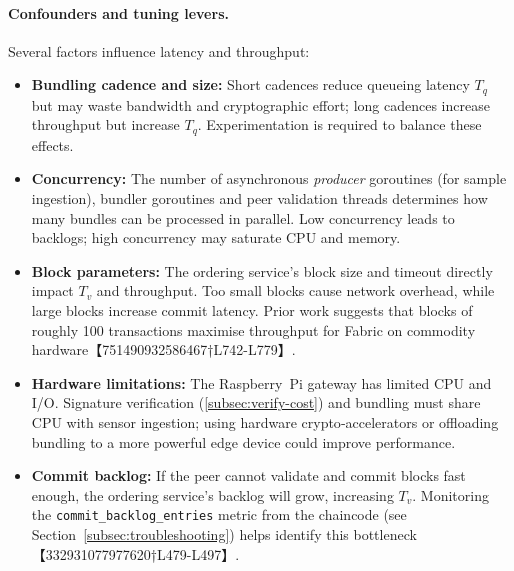 \paragraph{Confounders and tuning levers.}  Several factors influence latency
and throughput:
\begin{itemize}
  \item \textbf{Bundling cadence and size:} Short cadences reduce queueing
    latency $T_q$ but may waste bandwidth and cryptographic effort; long
    cadences increase throughput but increase $T_q$.  Experimentation is
    required to balance these effects.
  \item \textbf{Concurrency:} The number of asynchronous \emph{producer}
    goroutines (for sample ingestion), bundler goroutines and peer validation
    threads determines how many bundles can be processed in parallel.  Low
    concurrency leads to backlogs; high concurrency may saturate CPU and memory.
  \item \textbf{Block parameters:} The ordering service’s block size and
    timeout directly impact $T_v$ and throughput.  Too small blocks cause
    network overhead, while large blocks increase commit latency.  Prior work
    suggests that blocks of roughly 100 transactions maximise throughput for
    Fabric on commodity hardware【751490932586467†L742-L779】.
  \item \textbf{Hardware limitations:} The Raspberry~Pi gateway has limited
    CPU and I/O.  Signature verification (\autoref{subsec:verify-cost}) and
    bundling must share CPU with sensor ingestion; using hardware
    crypto‑accelerators or offloading bundling to a more powerful edge device
    could improve performance.
  \item \textbf{Commit backlog:} If the peer cannot validate and commit
    blocks fast enough, the ordering service’s backlog will grow, increasing
    $T_v$.  Monitoring the \texttt{commit\_backlog\_entries} metric
    from the chaincode (see Section~\ref{subsec:troubleshooting}) helps
    identify this bottleneck【332931077977620†L479-L497】.
\end{itemize}


